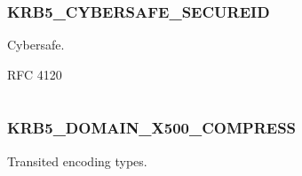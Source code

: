 \documentclass[letterpaper,10pt,english]{sphinxmanual}
\begin{document}
\begin{tabulary}{\linewidth}{|L|L|}
\hline

 & 
\\
\hline\end{tabulary}



\subsubsection{KRB5\_CYBERSAFE\_SECUREID}
\label{appdev/refs/macros/KRB5_CYBERSAFE_SECUREID:krb5-cybersafe-secureid}\label{appdev/refs/macros/KRB5_CYBERSAFE_SECUREID::doc}\label{appdev/refs/macros/KRB5_CYBERSAFE_SECUREID:krb5-cybersafe-secureid-data}

\begin{fulllineitems}
\label{appdev/refs/macros/KRB5_CYBERSAFE_SECUREID:KRB5_CYBERSAFE_SECUREID}
\end{fulllineitems}


Cybersafe.

RFC 4120

\begin{tabulary}{\linewidth}{|L|L|}
\hline

 & 
\\
\hline\end{tabulary}



\subsubsection{KRB5\_DOMAIN\_X500\_COMPRESS}
\label{appdev/refs/macros/KRB5_DOMAIN_X500_COMPRESS::doc}\label{appdev/refs/macros/KRB5_DOMAIN_X500_COMPRESS:krb5-domain-x500-compress}\label{appdev/refs/macros/KRB5_DOMAIN_X500_COMPRESS:krb5-domain-x500-compress-data}

\begin{fulllineitems}
\label{appdev/refs/macros/KRB5_DOMAIN_X500_COMPRESS:KRB5_DOMAIN_X500_COMPRESS}
\end{fulllineitems}


Transited encoding types.

\begin{tabulary}{\linewidth}{|L|L|}
\hline

 & 
\\
\hline\end{tabulary}
\end{document}

